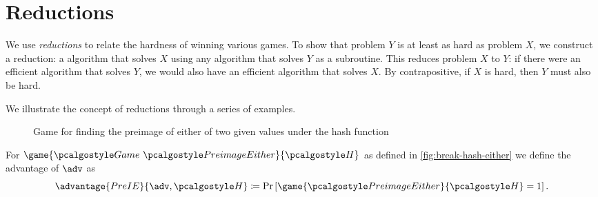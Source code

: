 \section{Reductions}
We use \emph{reductions} to relate the hardness of winning various games.
To show that problem $Y$ is at least as hard as problem $X$, we construct a reduction: a \ppt algorithm that solves $X$ using any algorithm that solves $Y$ as a subroutine.
This reduces problem $X$ to $Y$: if there were an efficient algorithm that solves $Y$, we would also have an efficient algorithm that solves $X$.
By contrapositive, if $X$ is hard, then $Y$ must also be hard.

We illustrate the concept of reductions through a series of examples.

\begin{figure}[tbhp]
  \begin{center}
    \begin{tcolorbox}[width=7cm]
      \begin{pchstack}[center]
      \end{pchstack}
    \end{tcolorbox}
  \end{center}
  \caption{Game for finding the preimage of either of two given values under the hash function \label{fig:break-hash-either}}
\end{figure}


\begin{definition}
  For $\game{\Game~\algo{PreimageEither}}{\algo{H}}$ as defined in \autoref{fig:break-hash-either} we define the advantage of $\adv$ as
 \[
  \advantage{PreIE}{\adv, \algo{H}} \defeq \pr{\game{\algo{PreimageEither}}{\algo{H}} = 1}.
 \]
\end{definition}

